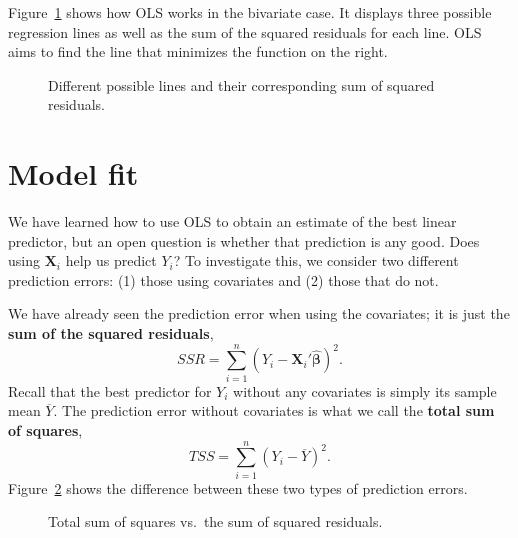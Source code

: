 \documentclass[
  13pt,
  letterpaper,
  DIV=11,
  numbers=noendperiod]{scrreprt}
\newcommand{\mb}{\symbf}
\newcommand{\X}{\mb{X}}
\newcommand{\bhat}{\widehat{\mb{\beta}}}
\theoremstyle{definition}
\theoremstyle{definition}
\theoremstyle{plain}
\theoremstyle{remark}
\begin{document}
Figure~\ref{fig-ssr-comp} shows how OLS works in the bivariate case. It
displays three possible regression lines as well as the sum of the
squared residuals for each line. OLS aims to find the line that
minimizes the function on the right.

\begin{figure}[th]


\caption{\label{fig-ssr-comp}Different possible lines and their
corresponding sum of squared residuals.}

\end{figure}%

\section{Model fit}\label{model-fit}

We have learned how to use OLS to obtain an estimate of the best linear
predictor, but an open question is whether that prediction is any good.
Does using \(\X_i\) help us predict \(Y_i\)? To investigate this, we
consider two different prediction errors: (1) those using covariates and
(2) those that do not.

We have already seen the prediction error when using the covariates; it
is just the \textbf{sum of the squared residuals}, \[ 
SSR = \sum_{i=1}^n (Y_i - \X_{i}'\bhat)^2.
\] Recall that the best predictor for \(Y_i\) without any covariates is
simply its sample mean \(\overline{Y}\). The prediction error without
covariates is what we call the \textbf{total sum of squares}, \[ 
TSS = \sum_{i=1}^n (Y_i - \overline{Y})^2.
\] Figure~\ref{fig-ssr-vs-tss} shows the difference between these two
types of prediction errors.

\begin{figure}[th]


\caption{\label{fig-ssr-vs-tss}Total sum of squares vs.~the sum of
squared residuals.}

\end{figure}%
\end{document}
